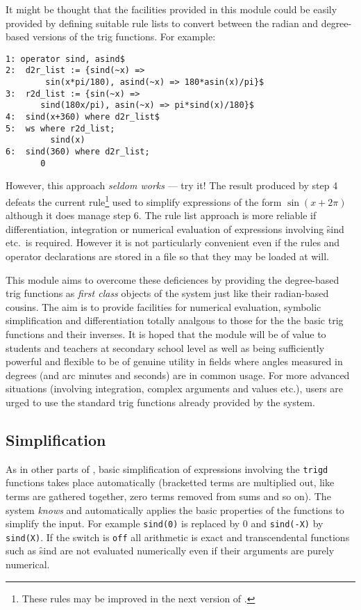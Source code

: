 It might be thought that the facilities provided in this module could be easily provided by defining suitable rule lists to convert between the radian and degree-based versions of the trig functions.  For example:
\begin{verbatim}
1: operator sind, asind$
2:  d2r_list := {sind(~x) =>
        sin(x*pi/180), asind(~x) => 180*asin(x)/pi}$ 
3:  r2d_list := {sin(~x) => 
       sind(180x/pi), asin(~x) => pi*sind(x)/180}$
4:  sind(x+360) where d2r_list$
5:  ws where r2d_list;
         sind(x)
6:  sind(360) where d2r_list;
       0
\end{verbatim}

However, this approach \emph{seldom works} --- try it! The result produced by step 4 defeats the current rule\footnote{These rules may be improved in the next version of {\REDUCE}.} 
used to simplify expressions of the form $\sin(x+2\pi)$  although it does manage step 6.  
The rule list approach is more reliable if differentiation, integration or numerical evaluation of expressions involving \f{sind} etc.\  is required.  However it is not particularly convenient even if the rules  and operator declarations are stored in a file so that they may be loaded at will.

This module aims to overcome these deficiences by providing the degree-based trig  functions as \emph{first class} objects of the system just like their radian-based cousins. The aim is to provide facilities for numerical evaluation, symbolic simplification and differentiation totally analgous to those for the the basic trig functions and their inverses.  It is hoped that the module will be of value to students and teachers at secondary school level as well as being sufficiently powerful and flexible to be of genuine utility in fields where angles measured in degrees (and  arc minutes and seconds) are in common usage.  For more advanced situations (involving integration, complex arguments and values etc.),  users are urged to use the standard trig  functions already provided by the system.

\subsection{Simplification}
As in other parts of {\REDUCE}, basic simplification of expressions involving the \texttt{trigd} functions takes place automatically (bracketted terms are multiplied out, like terms are gathered together, zero terms removed from sums and so on).  The system \textit{knows} and automatically applies the basic properties of the functions to simplify the input.   For example \texttt{sind(0)} is replaced by 0 and \texttt{sind(-X)} by \texttt{sind(X)}.  If the switch  is \texttt{off} all arithmetic is exact and transcendental functions  such as \f{sind} are not evaluated numerically even if their arguments are purely numerical.

